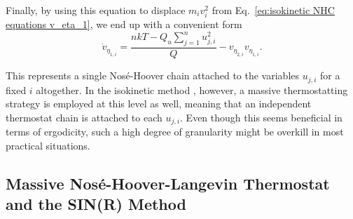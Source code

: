 \documentclass[
aip,
jcp,
reprint,
]{revtex4-1}
\newcommand{\nn}{n}
\begin{document}
Finally, by using this equation to displace $m_i v_i^2$ from Eq.~\eqref{eq:isokinetic NHC equations v_eta_1}, we end up with a convenient form
\begin{equation}
\dot{v}_{\eta_{1, i}} = \frac{nkT - Q_u \sum_{j=1}^\nn u_{j, i}^2}{Q} - v_{\eta_{2, i}} v_{\eta_{1, i}}.
\end{equation}

This represents a single Nos\'{e}-Hoover chain attached to the variables $u_{j, i}$ for a fixed $i$ altogether.
In the isokinetic method \cite{Minary_2004}, however, a massive thermostatting strategy is employed at this level as well, meaning that an independent thermostat chain is attached to each $u_{j, i}$.
Even though this seems beneficial in terms of ergodicity, such a high degree of granularity might be overkill in most practical situations.

\subsection{Massive Nos\'{e}-Hoover-Langevin Thermostat and the SIN(R) Method}
\label{sec:nose-hoover-langevin}
\end{document}
